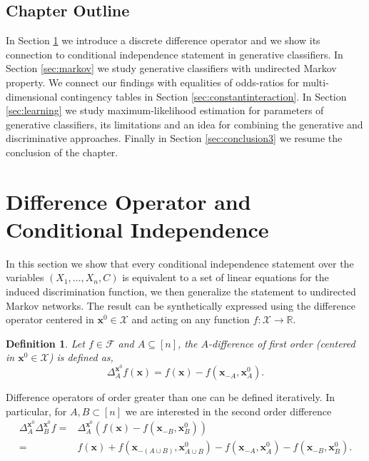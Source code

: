 \documentclass[11pt,a4paper, twoside]{book}
\newtheorem{definition}{Definition}[chapter]
\newcommand{\bx}{\mathbf{x}}
\newcommand{\bchi}{\boldsymbol{\mathcal{X}}}
\begin{document}
\subsection{Chapter Outline}

In Section \ref{sec:diffoper} we introduce a discrete difference operator and we show its connection to conditional independence statement in generative classifiers.
In Section \ref{sec:markov} we study generative classifiers with undirected Markov property.
We connect our findings with equalities of odds-ratios for multi-dimensional contingency tables in Section \ref{sec:constantinteraction}.
In Section \ref{sec:learning} we study maximum-likelihood estimation for parameters of generative classifiers, its limitations and an idea for combining the generative and discriminative approaches.  
Finally in Section \ref{sec:conclusion3} we resume the conclusion of the chapter.
 

\section{Difference Operator and Conditional Independence}
\label{sec:diffoper}

In this section we show that every conditional independence statement over the variables $(X_1,\ldots,X_n,C)$ is equivalent to a set of linear equations for the induced discrimination function, we then generalize the statement to undirected Markov networks.
The result can be synthetically expressed using the difference operator centered in $\bx^0 \in \bchi$ and acting on any function $f : \bchi \longrightarrow \mathbb{R}$. 

\begin{definition}
\label{def:difference}
Let $f \in \mathcal{F}$ and $A\subseteq[n]$, the $A$-difference of first order (centered in $\bx^0 \in \bchi$) is defined as,
$$ \Delta^{\bx^0}_{A}f(\bx) = f(\bx) - f(\bx_{-A},\bx^0_A) .$$ 
\end{definition}

Difference operators of order greater than one can be defined iteratively.
In particular, for $A,B\subset [n]$ we are interested in the second order difference
\begin{align*}
\Delta^{\bx^0}_{A}\Delta^{\bx^0}_{B} f = & \Delta^{\bx^0}_A(f(\bx)-f(\bx_{-B},\bx_{B}^{0})) \\ 
                                       = & f(\bx) + f(\bx_{-(A\cup B)},\bx_{A\cup B}^{0}) - f(\bx_{-A},\bx_{A}^{0})- f(\bx_{-B},\bx_{B}^{0})  .
\end{align*} 
\end{document}
